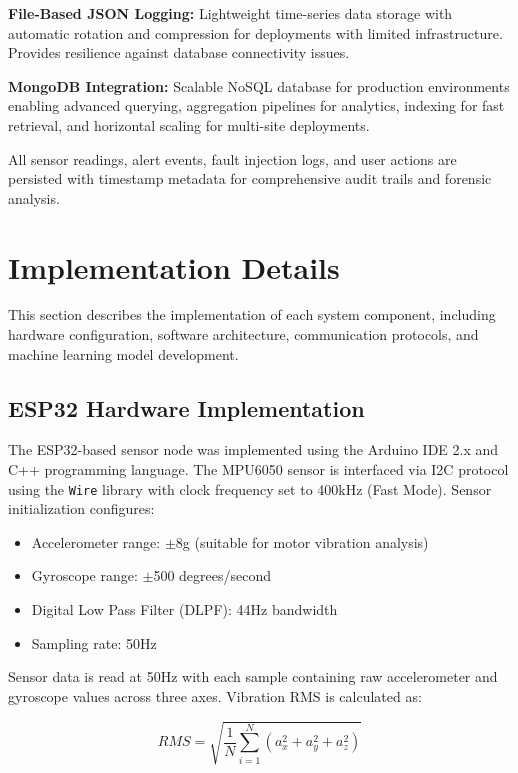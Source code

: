 \documentclass[conference]{IEEEtran}
\begin{document}
\textbf{File-Based JSON Logging:} Lightweight time-series data storage with automatic rotation and compression for deployments with limited infrastructure. Provides resilience against database connectivity issues.

\textbf{MongoDB Integration:} Scalable NoSQL database for production environments enabling advanced querying, aggregation pipelines for analytics, indexing for fast retrieval, and horizontal scaling for multi-site deployments.

All sensor readings, alert events, fault injection logs, and user actions are persisted with timestamp metadata for comprehensive audit trails and forensic analysis.

\section{Implementation Details}

This section describes the implementation of each system component, including hardware configuration, software architecture, communication protocols, and machine learning model development.

\subsection{ESP32 Hardware Implementation}

The ESP32-based sensor node was implemented using the Arduino IDE 2.x and C++ programming language. The MPU6050 sensor is interfaced via I2C protocol using the \texttt{Wire} library with clock frequency set to 400kHz (Fast Mode). Sensor initialization configures:

\begin{itemize}
\item Accelerometer range: $\pm$8g (suitable for motor vibration analysis)
\item Gyroscope range: $\pm$500 degrees/second
\item Digital Low Pass Filter (DLPF): 44Hz bandwidth
\item Sampling rate: 50Hz
\end{itemize}

Sensor data is read at 50Hz with each sample containing raw accelerometer and gyroscope values across three axes. Vibration RMS is calculated as:

\begin{equation}
RMS = \sqrt{\frac{1}{N}\sum_{i=1}^{N}(a_x^2 + a_y^2 + a_z^2)}
\end{equation}
\end{document}
